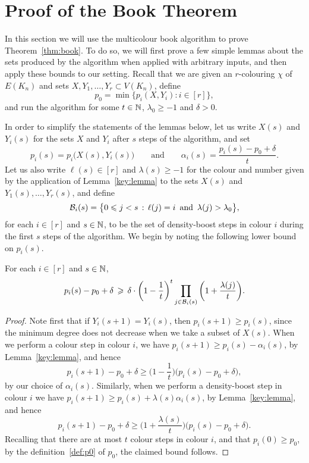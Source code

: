 \section{Proof of the Book Theorem}\label{sec:book:proof}

In this section we will use the multicolour book algorithm to prove Theorem~\ref{thm:book}. To do so, we will first prove a few simple lemmas about the sets produced by the algorithm when applied with arbitrary inputs, and then apply these bounds to our setting. Recall that we are given an $r$-colouring $\chi$ of $E(K_n)$ and %
sets $X,Y_1,\ldots,Y_r \subset V(K_n)$, define 
\begin{equation}\label{def:p0}
p_0 = \min\big\{ p_i(X,Y_i) : i \in [r] \big\},
\end{equation}
and run the algorithm for some $t \in \mathbb{N}$, $\lambda_0 \ge -1$ and $\delta > 0$.

In order to simplify the statements of the lemmas below, let us write $X(s)$ and $Y_i(s)$ for the sets $X$ and $Y_i$ after $s$ steps of the algorithm, and set 
$$p_i(s) = p_i\big( X(s), Y_i(s) \big) \qquad \text{and} \qquad \alpha_i(s) = \frac{p_i(s) - p_0 + \delta}{t}.$$ 
Let us also write $\ell(s) \in [r]$ and $\lambda(s) \ge -1$ for the colour and number given by the application of Lemma~\ref{key:lemma} to the sets $X(s)$ and $Y_1(s),\dots,Y_r(s)$, and define
$$\mathcal{B}_i(s) = \big\{ 0 \leqslant j < s \,:\, \ell(j) = i \, \text{ and } \, \lambda(j) > \lambda_0 \big\},$$
for each $i \in [r]$ and $s \in \mathbb{N}$, to be the set of density-boost steps in colour $i$ during the first $s$ steps of the algorithm. We begin by noting the following lower bound on $p_i(s)$. 

\begin{lemma}\label{lem:pi:lower:bound}
For each $i \in [r]$ and $s \in \mathbb{N}$, 
\begin{equation}\label{eq:pi:lower:bound}
p_i(s) - p_0 + \delta \, \geqslant \, \delta \cdot \bigg( 1 - \frac{1}{t} \bigg)^{t} \prod_{j \in \mathcal{B}_i(s)} \bigg( 1 + \frac{\lambda(j)}{t} \bigg).
\end{equation}
\end{lemma}

\begin{proof}
Note first that if $Y_i(s+1) = Y_i(s)$, then $p_i(s+1) \ge p_i(s)$, since the minimum degree does not decrease when we take a subset of $X(s)$. When we perform a colour step in colour $i$, %
we have $p_i(s+1) \ge p_i(s) - \alpha_i(s)$, by Lemma~\ref{key:lemma}, and hence
$$p_i(s+1) - p_0 + \delta \ge \bigg( 1 - \frac{1}{t} \bigg) \big( p_i(s) - p_0 + \delta \big),$$
by our choice of $\alpha_i(s)$. Similarly, when we perform a density-boost step in colour $i$  
we have $p_i(s+1) \ge p_i(s) + \lambda(s) \alpha_i(s)$, by Lemma~\ref{key:lemma}, and hence
$$p_i(s+1) - p_0 + \delta \ge \bigg( 1 + \frac{\lambda(s)}{t} \bigg) \big( p_i(s) - p_0 + \delta \big).$$
Recalling that there are at most $t$ colour steps in colour $i$, and that $p_i(0) \ge p_0$, by the definition~\eqref{def:p0} of $p_0$, the claimed bound follows. 
\end{proof}

